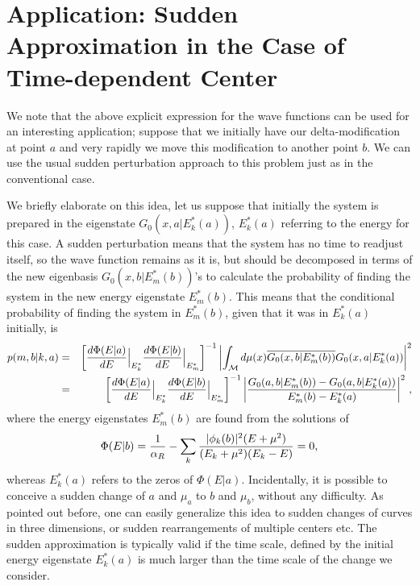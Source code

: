 \documentclass[amsmath,amssymb,14pt]{article}
\numberwithin{equation}{section}
\newtheorem{myremark}[mytheo]{Remark}
\begin{document}
\section{Application: Sudden Approximation in the Case of Time-dependent Center}

    We note that the above explicit expression for the wave functions can be used for an interesting application; suppose that we initially have our delta-modification at point $a$ and very rapidly we move this modification to another point $b$. We can use the usual sudden perturbation approach to this problem just as in the conventional case.

We briefly elaborate on this idea, let us suppose that initially the system is prepared in the eigenstate $G_0(x, a|E_k^*(a))$,  $E_k^*(a)$ referring to the energy for this case. A sudden perturbation means that the system has no time to readjust itself, so the wave function remains as it is, but should be decomposed in terms of the new eigenbasis $G_0(x,b|E_m^*(b))$'s to calculate the probability of finding the system in the new energy eigenstate $E_m^*(b)$. This means that the conditional probability of finding the system in $E_m^*(b)$, given that it was in $E_k^*(a)$ initially, is
\begin{eqnarray}
    p(m,b|k,a)&=&\left[ {d\Phi(E|a)\over dE}\Big|_{E_k^*} {d\Phi(E|b)\over dE}\Big|_{E_m^*}\right]^{-1}\left|\int_{\mathcal M} d\mu(x) \overline{G_0(x, b|E_m^*(b))}G_0(x, a|E_k^*(a))\right|^2 \nonumber\\
    &=& \left[ {d\Phi(E|a)\over dE}\Big|_{E_k^*} {d\Phi(E|b)\over dE}\Big|_{E_m^*}\right]^{-1}\left | {G_0(a,b|E_m^*(b))- G_0(a,b|E_k^*(a))\over E_m^*(b)-E_k^*(a)}\right|^2\, ,\nonumber
    \end{eqnarray}
%    
where the energy eigenstates $E_m^*(b)$
are found from the solutions of 
\begin{equation}
    \Phi(E|b)=\frac{1}{\alpha_R} -\sum_k{ |\phi_k(b)|^2(E+\mu^2)\over (E_k+\mu^2)(E_k-E)}=0,
\end{equation}
whereas $E_k^*(a)$ refers to the zeros of $\Phi(E|a)$. Incidentally, it is possible to conceive a sudden change of $a$ and $\mu_a$ to $b$ and $\mu_b$, without any difficulty. As pointed out before, one can easily generalize this idea to sudden changes of curves in three dimensions, or sudden rearrangements of multiple centers etc. The sudden approximation is typically valid if the time scale, defined by the initial energy eigenstate $E_k^*(a)$ is much larger than the time scale of the change we consider.
\end{document}
